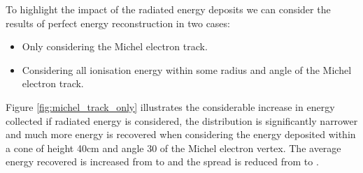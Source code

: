 To highlight the impact of the radiated energy deposits we can consider the 
results of perfect energy reconstruction in two cases:
\begin{itemize}
	\item Only considering the Michel electron track.
	\item Considering all ionisation energy within some radius and angle of the 
		Michel electron track.
\end{itemize}
Figure \ref{fig:michel_track_only} illustrates the considerable increase in energy
collected if radiated energy is considered, the distribution is significantly
narrower and much more energy is recovered when considering the energy deposited
within a cone of height 40cm and angle 30 \textdegree of the Michel electron
vertex. The average energy recovered is increased from  to
 and the spread is reduced from  to
.

